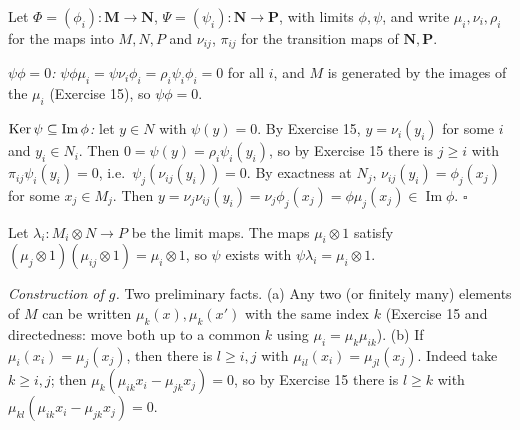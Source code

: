 \documentclass[11pt]{article}
\begin{document}
\pf
Let $\Phi=(\phi_i):\mathbf M\to\mathbf N$, $\Psi=(\psi_i):\mathbf N\to\mathbf P$, with limits $\phi,\psi$, and write $\mu_i,\nu_i,\rho_i$ for the maps into $M,N,P$ and $\nu_{ij}$, $\pi_{ij}$ for the transition maps of $\mathbf N,\mathbf P$.

\emph{$\psi\phi=0$:} $\psi\phi\mu_i=\psi\nu_i\phi_i=\rho_i\psi_i\phi_i=0$ for all $i$, and $M$ is generated by the images of the $\mu_i$ (Exercise 15), so $\psi\phi=0$.

\emph{$\operatorname{Ker}\psi\subseteq\operatorname{Im}\phi$:} let $y\in N$ with $\psi(y)=0$. By Exercise 15, $y=\nu_i(y_i)$ for some $i$ and $y_i\in N_i$. Then $0=\psi(y)=\rho_i\psi_i(y_i)$, so by Exercise 15 there is $j\ge i$ with $\pi_{ij}\psi_i(y_i)=0$, i.e.\ $\psi_j(\nu_{ij}(y_i))=0$. By exactness at $N_j$, $\nu_{ij}(y_i)=\phi_j(x_j)$ for some $x_j\in M_j$. Then
$y=\nu_j\nu_{ij}(y_i)=\nu_j\phi_j(x_j)=\phi\mu_j(x_j)\in\operatorname{Im}\phi$. \hfill$\square$

\pf
Let $\lambda_i:M_i\otimes N\to P$ be the limit maps. The maps $\mu_i\otimes1$ satisfy $(\mu_j\otimes1)(\mu_{ij}\otimes1)=\mu_i\otimes1$, so $\psi$ exists with $\psi\lambda_i=\mu_i\otimes1$.

\emph{Construction of $g$.} Two preliminary facts.
(a) Any two (or finitely many) elements of $M$ can be written $\mu_k(x),\mu_k(x')$ with the same index $k$ (Exercise 15 and directedness: move both up to a common $k$ using $\mu_i=\mu_k\mu_{ik}$).
(b) If $\mu_i(x_i)=\mu_j(x_j)$, then there is $l\ge i,j$ with $\mu_{il}(x_i)=\mu_{jl}(x_j)$. Indeed take $k\ge i,j$; then $\mu_k(\mu_{ik}x_i-\mu_{jk}x_j)=0$, so by Exercise 15 there is $l\ge k$ with $\mu_{kl}(\mu_{ik}x_i-\mu_{jk}x_j)=0$.
\end{document}
